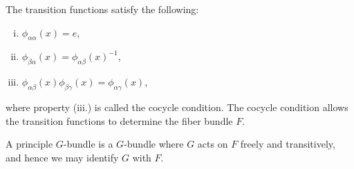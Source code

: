 The transition functions satisfy the following:
\begin{enumerate}[i.]
\item $\phi_{\alpha\alpha}(x)=e$,
\item $\phi_{\beta\alpha}(x)=\phi_{\alpha\beta}(x)^{-1}$,
\item $\phi_{\alpha\beta}(x)\phi_{\beta\gamma}(x)=\phi_{\alpha\gamma}(x)$,
\end{enumerate}
where property (iii.) is called the cocycle condition.  The cocycle condition allows the transition functions to determine the fiber bundle $F$.

A principle $G$-bundle is a $G$-bundle where $G$ acts on $F$ freely and transitively, and hence we may identify $G$ with $F$.










